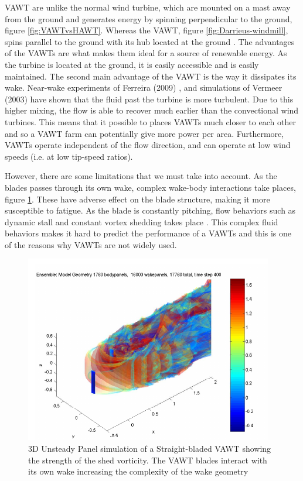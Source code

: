 VAWT are unlike the normal wind turbine, which are mounted on a mast away from the ground and generates energy by spinning perpendicular to the ground, figure \ref{fig:VAWTvsHAWT}. Whereas the VAWT, figure \ref{fig:Darrieus-windmill}, spins parallel to the ground with its hub located at the ground \cite{website:wikiVAWT}. The advantages of the VAWTs are what makes them ideal for a source of renewable energy. As the turbine is located at the ground, it is easily accessible and is easily maintained. The second main advantage of the VAWT is the way it dissipates its wake. Near-wake experiments of Ferreira (2009) \cite{Ferreira}, and simulations of Vermeer (2003) \cite{Vermeer2003} have shown that the fluid past the turbine is more turbulent. Due to this higher mixing, the flow is able to recover much earlier than the convectional wind turbines. This means that it possible to places VAWTs much closer to each other and so a VAWT farm can potentially give more power per area. Furthermore, VAWTs operate independent of the flow direction, and can operate at low wind speeds (i.e. at low tip-speed ratios).

However, there are some limitations that we must take into account. As the blades passes through its own wake, complex wake-body interactions take places, figure \ref{fig:3DunsteadyPanelVAWT}. These have adverse effect on the blade structure, making it more susceptible to fatigue. As the blade is constantly pitching, flow behaviors such as dynamic stall and constant vortex shedding takes place \cite{SimaoFerreira2008}. This complex fluid behaviors makes it hard to predict the performance of a VAWTs and this is one of the reasons why VAWTs are not widely used. 

	\begin{figure}[!t]
		\centering
		\includegraphics[width=0.6\linewidth]{figures/introduction/3DunsteadyPanelVAWT.png}
		\caption{3D Unsteady Panel simulation of a Straight-bladed VAWT showing the strength of the shed vorticity. The VAWT blades interact with its own wake increasing the complexity of the wake geometry \cite{Dixon}}
		\label{fig:3DunsteadyPanelVAWT}
	\end{figure}

